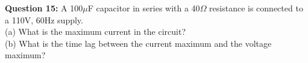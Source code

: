\documentclass[journal,12pt,twocolumn]{IEEEtran}
\theoremstyle{remark}
\begin{document}



\maketitle

\newpage


\bigskip

\renewcommand{\thefigure}{\arabic{figure}}
\renewcommand{\thetable}{\arabic{table}}

%




%
\textbf{Question 15: }
A 100$\mu$F capacitor in series with a 40$\Omega$ resistance is
connected to a 110V, 60Hz supply.\\
(a) What is the maximum current in the circuit?\\
(b) What is the time lag between the current maximum and the voltage maximum?\\
\end{document}
